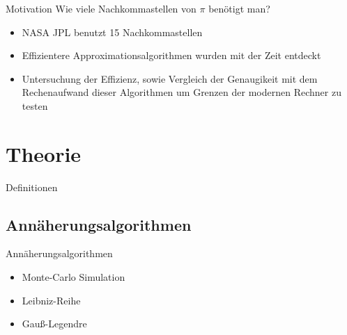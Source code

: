 \documentclass{beamer}
\begin{document}
\begin{frame}{Motivation}
    Wie viele Nachkommastellen von \(\pi\) benötigt man?
    \begin{itemize}
        \item<2-> NASA JPL benutzt 15 Nachkommastellen \cite{NASA}                                                                                         
    \end{itemize}
 \begin{itemize}
    \item<4-> Effizientere Approximationsalgorithmen wurden mit der Zeit entdeckt
    \item<5-> Untersuchung der Effizienz, sowie Vergleich der Genaugikeit mit dem Rechenaufwand dieser Algorithmen 
              um Grenzen der modernen Rechner zu testen
\end{itemize}
\end{frame}

\section{Theorie}

\begin{frame}{Definitionen}
\end{frame}

\subsection{Annäherungsalgorithmen}

\begin{frame}{Annäherungsalgorithmen}
    \begin{itemize}
        \item Monte-Carlo Simulation
        \item Leibniz-Reihe
        \item Gauß-Legendre
    \end{itemize}
\end{frame}
\end{document}
